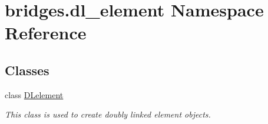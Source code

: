 \hypertarget{namespacebridges_1_1dl__element}{}\section{bridges.\+dl\+\_\+element Namespace Reference}
\label{namespacebridges_1_1dl__element}
\subsection*{Classes}
\begin{DoxyCompactItemize}
\item 
class \mbox{\hyperlink{classbridges_1_1dl__element_1_1_d_lelement}{D\+Lelement}}
\begin{DoxyCompactList}\small\item\em This class is used to create doubly linked element objects. \end{DoxyCompactList}\end{DoxyCompactItemize}
